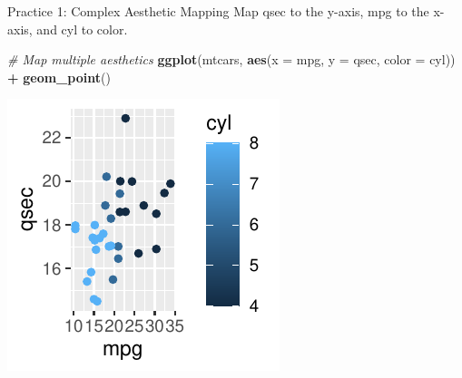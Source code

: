 \documentclass[
  ignorenonframetext,
]{beamer}
\newenvironment{Shaded}{\begin{snugshade}}{\end{snugshade}}
\newcommand{\AttributeTok}[1]{\textcolor[rgb]{0.13,0.29,0.53}{#1}}
\newcommand{\CommentTok}[1]{\textcolor[rgb]{0.56,0.35,0.01}{\textit{#1}}}
\newcommand{\FunctionTok}[1]{\textcolor[rgb]{0.13,0.29,0.53}{\textbf{#1}}}
\newcommand{\NormalTok}[1]{#1}
\newcommand{\SpecialCharTok}[1]{\textcolor[rgb]{0.81,0.36,0.00}{\textbf{#1}}}
\begin{document}
\begin{frame}[fragile]{Practice 1: Complex Aesthetic Mapping}
\label{practice-1-complex-aesthetic-mapping}
Map qsec to the y-axis, mpg to the x-axis, and cyl to color.


\begin{Shaded}
\begin{Highlighting}[]
\CommentTok{\# Map multiple aesthetics}
\FunctionTok{ggplot}\NormalTok{(mtcars, }\FunctionTok{aes}\NormalTok{(}\AttributeTok{x =}\NormalTok{ mpg, }\AttributeTok{y =}\NormalTok{ qsec, }\AttributeTok{color =}\NormalTok{ cyl)) }\SpecialCharTok{+} \FunctionTok{geom\_point}\NormalTok{()}
\end{Highlighting}
\end{Shaded}

\begin{center}\includegraphics[width=0.5\linewidth]{Figs/unnamed-chunk-25-1} \end{center}
\end{frame}
\end{document}
